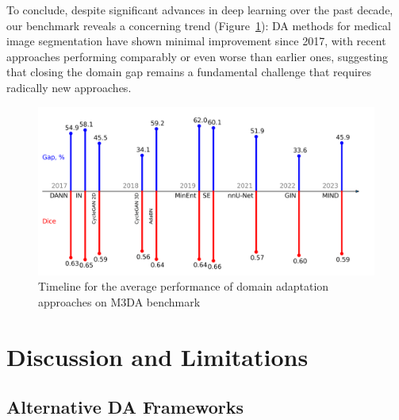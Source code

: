 To conclude, despite significant advances in deep learning over the past decade, our benchmark reveals a concerning trend (Figure~\ref{fig:teaser3}): DA methods for medical image segmentation have shown minimal improvement since 2017, with recent approaches performing comparably or even worse than earlier ones, suggesting that closing the domain gap remains a fundamental challenge that requires radically new approaches.

\begin{figure}
	\includegraphics[width=\linewidth]{Dissertation/Figures/4_da_bench/cvpr_m3da_methods_timeline.png}
	\caption{Timeline for the average performance of domain adaptation approaches on M3DA benchmark}  %
	\label{fig:teaser3}
\end{figure}


%
%
%



\section{Discussion and Limitations}

\subsection{Alternative DA Frameworks}

